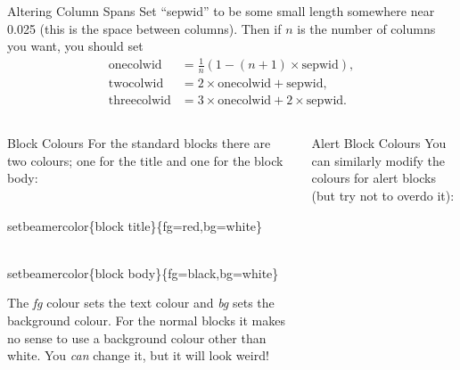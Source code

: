 \documentclass[final]{beamer}
\newlength{\sepwid}
\newlength{\onecolwid}
\newlength{\twocolwid}
\newlength{\threecolwid}
\begin{document}
\begin{frame}[t]
\begin{columns}[t]
\begin{column}{\twocolwid}
\begin{block}{Altering Column Spans}
        Set ``sepwid'' to be some small length somewhere near 0.025 (this is the space between columns). Then if $n$ is the number of columns you want, you should set
        \begin{align*}
          \text{onecolwid} & = \frac{1}{n}(1-(n+1)\times\text{sepwid}), \\
          \text{twocolwid} & = 2\times\text{onecolwid} + \text{sepwid}, \\
          \text{threecolwid} & = 3\times\text{onecolwid} + 2\times\text{sepwid}.
        \end{align*}
      \end{block}
      \begin{columns}[t,totalwidth=\threecolwid]	%
        \begin{column}{\onecolwid}
          \begin{block}{Block Colours}
            For the standard blocks there are two colours; one for the title and one for the block body:\\
            \begin{semiverbatim}
              {\color{red}\\setbeamercolor}\{block title\}\newline \{fg=red,bg=white\}
            \end{semiverbatim}
            \begin{semiverbatim}
              {\color{red}\\setbeamercolor}\{block  body\}\newline \{fg=black,bg=white\}
            \end{semiverbatim}
            The \emph{fg} colour sets the text colour and \emph{bg} sets the background colour.
            For the normal blocks it makes no sense to use a background colour other than white. You \emph{can} change it, but it will look weird!
          \end{block}
        \end{column}
        \begin{column}{\onecolwid}
          \begin{alertblock}{Alert Block Colours}
            You can similarly modify the colours for alert blocks (but try not to overdo it):\\

\end{alertblock}
\end{column}
\end{columns}
\end{column}
\end{columns}
\end{frame}
\end{document}
